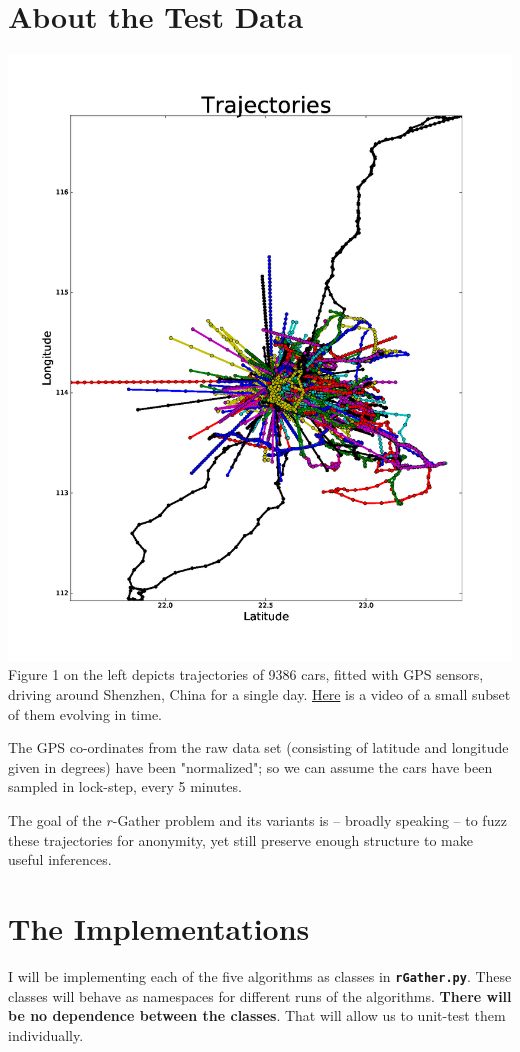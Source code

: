 \documentclass[11pt]{article}
\begin{document}
\section{About the Test Data}
\label{sec-2}
\href{./shenzhen_trajectory_data.png}{\includegraphics[width=.9\linewidth]{./InputOutput/shenzhen_trajectory_data.png}}
Figure 1 on the left depicts trajectories of 9386 cars, fitted with GPS sensors, driving 
around Shenzhen, China for a single day. \href{shenzen_normalized_data_animation_for_small_subset_of_cars.mp4}{Here} is a video of a small subset of them evolving in time.  

The GPS co-ordinates from the raw data set (consisting of latitude and longitude given in degrees) 
have been "normalized"; so we can assume the cars have been sampled in lock-step, every 5 minutes.

The goal of the $r$-Gather problem and its variants is -- broadly speaking -- to fuzz these trajectories for anonymity, 
yet still preserve enough structure to make useful inferences. 




\section{The Implementations}
\label{sec-3}
I will be implementing each of the five algorithms as classes in \textbf{\verb~rGather.py~}. These classes will behave as 
namespaces for different runs of the algorithms. \textbf{There will be no dependence between the classes}. That will 
allow us to unit-test them individually.  
\end{document}
